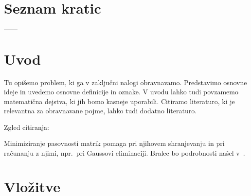 \documentclass[12pt,a4paper,titlepage,openany]{report}
\begin{document}
\tableofcontents
{}
\newpage
\listoftables
{}
\newpage
\listoffigures
{}
\newpage
\renewcommand{\cftdot}{}
\listofappendices
\thispagestyle{fancy}
\newpage

\chapter*{Seznam kratic}
\thispagestyle{fancyplain}
\begin{longtable}{@{}p{1cm}@{}p{\dimexpr\textwidth-1cm\relax}@{}}
\nomenclature{$tj.$}{to je}
\nomenclature{$npr.$}{na primer}
\end{longtable}
\newpage

\normalsize


% 
% 

\chapter{Uvod}
\thispagestyle{fancy}

Tu opišemo problem, ki ga v zaključni nalogi obravnavamo. Predstavimo osnovne ideje in uvedemo
osnovne definicije in oznake. V uvodu lahko tudi povzamemo matematična dejstva, ki jih bomo
kasneje uporabili. Citiramo literaturo, ki je relevantna za obravnavane pojme, lahko tudi dodatno literaturo.


\medskip
\noindent Zgled citiranja:

\medskip
Minimiziranje pasovnosti matrik pomaga pri njihovem shranjevanju in pri računanju z njimi, npr.~pri Gaussovi eliminaciji. Bralec bo podrobnosti našel v~\cite{Chinn, George, Strang}.


\chapter{Vložitve}
\thispagestyle{fancy}
\end{document}
